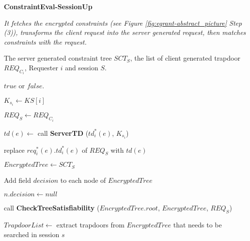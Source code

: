 \documentclass[epsfig,a4paper,11pt,titlepage]{book}
\numberwithin{algorithm}{chapter}
\newcommand{\algofontsize}{\fontsize{11}{12}\selectfont}
\begin{document}
\begin{algorithm} [htp]
{\algofontsize
\caption{\textbf{ConstraintEval-SessionUp}}

\label{algo:egrant-evaluate-constraint-session-up}

\begin{algorithmic}[1]



\INPUT \emph{It fetches the encrypted constraints (see Figure \ref{fig:egrant-abstract_picture} Step (3)), transforms the client request into the server generated request, then matches constraints with the request.}

\Require The server generated constraint tree $SCT_{S}$, the list of client generated trapdoor ${\mathit{REQ}}_{C_i}$, Requester $i$ and session $S$.

\Ensure $\mathit{true}$ or $\mathit{false}$.

\medskip

\State $K_{s_i} \leftarrow KS[i]$ {\algofontsize {}} \label{line:egrant-get-server-side-key}

\State ${\mathit{REQ}}_{S} \leftarrow REQ_{C_i}$ \label{line:egrant-re-enc-s-td-start}

\State $td(e) \leftarrow$ call \textbf{ServerTD} ($td^*_i (e)$, $K_{s_i}$)




	\State replace $\mathit{req}^*_i(e).td^*_i (e)$ of ${\mathit{REQ}}_{S}$ with $td(e)$
	
\EndFor \label{line:egrant-re-enc-s-td-end}

\State $EncryptedTree \leftarrow SCT_{S}$ \label{line:egrant-tree-match-start}

\State Add field $decision$ to each node of $\mathit{EncryptedTree}$

	\State $n.decision \leftarrow null$ {\algofontsize {}}
\EndFor

\State call \textbf{CheckTreeSatisfiability} ($EncryptedTree.root$, $\mathit{EncryptedTree}$, ${\mathit{REQ}}_{S}$) \label{line:egrant-tree-match-end}

 \label{line:egrant-tree-matched}

	\State $TrapdoorList \leftarrow$ extract trapdoors from $\mathit{EncryptedTree}$ that needs to be searched in session $s$ \label{line:egrant-extract-tds}
	

\end{algorithmic}}
\end{algorithm}
\end{document}
